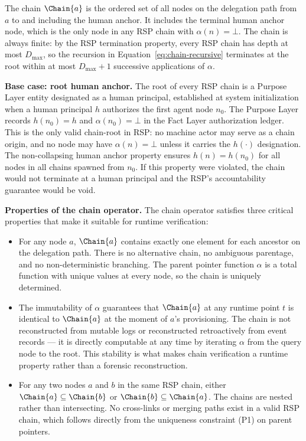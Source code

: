 The chain $\Chain{a}$ is the ordered set of all nodes on the delegation path from $a$ to and including the human anchor. It includes the terminal human anchor node, which is the only node in any RSP chain with $\alpha(n) = \bot$. The chain is always finite: by the RSP termination property, every RSP chain has depth at most $D_{\max}$, so the recursion in Equation~\ref{eq:chain-recursive} terminates at the root within at most $D_{\max} + 1$ successive applications of $\alpha$.

\medskip
\noindent\textbf{Base case: root human anchor.} The root of every RSP chain is a Purpose Layer entity designated as a human principal, established at system initialization when a human principal $h$ authorizes the first agent node $n_0$. The Purpose Layer records $h(n_0) = h$ and $\alpha(n_0) = \bot$ in the Fact Layer authorization ledger. This is the only valid chain-root in RSP: no machine actor may serve as a chain origin, and no node may have $\alpha(n) = \bot$ unless it carries the $h(\cdot)$ designation. The non-collapsing human anchor property ensures $h(n) = h(n_0)$ for all nodes in all chains spawned from $n_0$. If this property were violated, the chain would not terminate at a human principal and the RSP's accountability guarantee would be void.

\medskip
\noindent\textbf{Properties of the chain operator.} The chain operator satisfies three critical properties that make it suitable for runtime verification:

\begin{itemize}
    \item[(C1) \textbf{Determinism}] For any node $a$, $\Chain{a}$ contains exactly one element for each ancestor on the delegation path. There is no alternative chain, no ambiguous parentage, and no non-deterministic branching. The parent pointer function $\alpha$ is a total function with unique values at every node, so the chain is uniquely determined.

    \item[(C2) \textbf{Stability}] The immutability of $\alpha$ guarantees that $\Chain{a}$ at any runtime point $t$ is identical to $\Chain{a}$ at the moment of $a$'s provisioning. The chain is not reconstructed from mutable logs or reconstructed retroactively from event records --- it is directly computable at any time by iterating $\alpha$ from the query node to the root. This stability is what makes chain verification a runtime property rather than a forensic reconstruction.

    \item[(C3) \textbf{Compositionality}] For any two nodes $a$ and $b$ in the same RSP chain, either $\Chain{a} \subseteq \Chain{b}$ or $\Chain{b} \subseteq \Chain{a}$. The chains are nested rather than intersecting. No cross-links or merging paths exist in a valid RSP chain, which follows directly from the uniqueness constraint (P1) on parent pointers.
\end{itemize}

